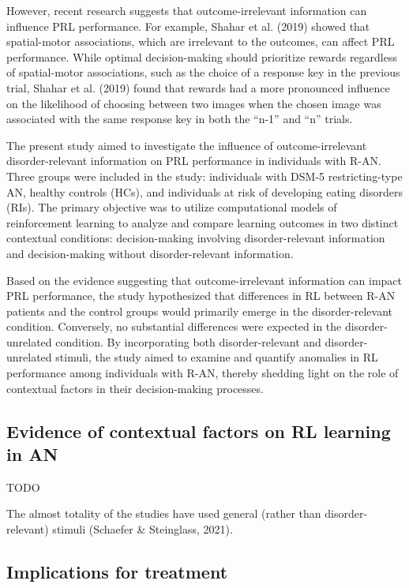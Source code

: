 \documentclass[
  man,floatsintext]{apa6}
\begin{document}
However, recent research suggests that outcome-irrelevant information can influence PRL performance. For example, Shahar et al. (2019) showed that spatial-motor associations, which are irrelevant to the outcomes, can affect PRL performance. While optimal decision-making should prioritize rewards regardless of spatial-motor associations, such as the choice of a response key in the previous trial, Shahar et al. (2019) found that rewards had a more pronounced influence on the likelihood of choosing between two images when the chosen image was associated with the same response key in both the ``n-1'' and ``n'' trials.

The present study aimed to investigate the influence of outcome-irrelevant disorder-relevant information on PRL performance in individuals with R-AN. Three groups were included in the study: individuals with DSM-5 restricting-type AN, healthy controls (HCs), and individuals at risk of developing eating disorders (RIs). The primary objective was to utilize computational models of reinforcement learning to analyze and compare learning outcomes in two distinct contextual conditions: decision-making involving disorder-relevant information and decision-making without disorder-relevant information.

Based on the evidence suggesting that outcome-irrelevant information can impact PRL performance, the study hypothesized that differences in RL between R-AN patients and the control groups would primarily emerge in the disorder-relevant condition. Conversely, no substantial differences were expected in the disorder-unrelated condition. By incorporating both disorder-relevant and disorder-unrelated stimuli, the study aimed to examine and quantify anomalies in RL performance among individuals with R-AN, thereby shedding light on the role of contextual factors in their decision-making processes.

\hypertarget{evidence-of-contextual-factors-on-rl-learning-in-an}{%
\subsection{Evidence of contextual factors on RL learning in AN}\label{evidence-of-contextual-factors-on-rl-learning-in-an}}

TODO

The almost totality of the studies have used general (rather than disorder-relevant) stimuli (Schaefer \& Steinglass, 2021).

\hypertarget{implications-for-treatment}{%
\subsection{Implications for treatment}\label{implications-for-treatment}}
\end{document}
